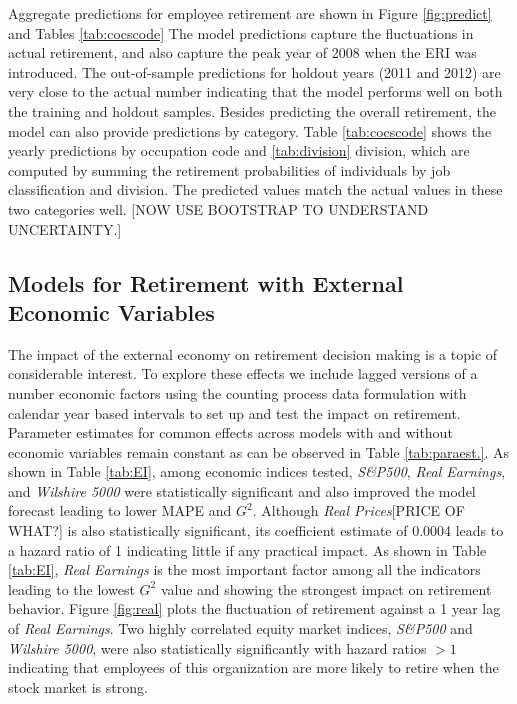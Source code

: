 \documentclass[12pt,letterpaper]{article}
\begin{document}
 Aggregate predictions for employee retirement are shown in Figure \ref{fig:predict} and Tables \ref{tab:cocscode} %
 The model predictions capture the fluctuations in actual retirement, and also capture the peak year of 2008 when the ERI was introduced. The out-of-sample predictions for holdout years (2011 and 2012) are very close to the actual number indicating that the model performs well on both the training and holdout samples. Besides predicting the overall retirement, the model can also provide predictions by category. Table \ref{tab:cocscode} shows the yearly predictions by occupation code and \ref{tab:division} division, which are computed by summing the retirement probabilities of individuals by job classification and division.  The predicted values match the actual values in these two categories well.  [NOW USE BOOTSTRAP TO UNDERSTAND UNCERTAINTY.]

\subsection{Models for Retirement with External Economic Variables}
   The impact of the external economy on retirement decision making is a topic of considerable interest.  To explore these effects we include lagged versions of a number economic factors using the counting process data formulation with calendar year based intervals to set up and test the impact on retirement. Parameter estimates for common effects across models with and without economic variables remain constant as can be observed in Table \ref{tab:paraest.}.  As shown in Table \ref{tab:EI}, among economic indices tested, {\it S\&P500}, {\it Real Earnings}, and {\it Wilshire 5000} were statistically significant and also improved the model forecast leading to lower MAPE and $G^2$.  Although {\it Real Prices}[PRICE OF WHAT?] is also statistically significant, its coefficient estimate of 0.0004 leads to a hazard ratio of 1 indicating little if any practical impact. As shown in Table \ref{tab:EI}, {\it Real Earnings} is the most important factor among all the indicators leading to the lowest $G^2$ value and showing the strongest impact on retirement behavior.  Figure \ref{fig:real} plots the fluctuation of retirement against a 1 year lag of {\it Real Earnings}. Two highly correlated equity market indices, {\it S\&P500} and {\it Wilshire 5000}, were also statistically significantly with hazard ratios $>1$ indicating that employees of this organization are more likely to retire when the stock market is strong.
\end{document}
